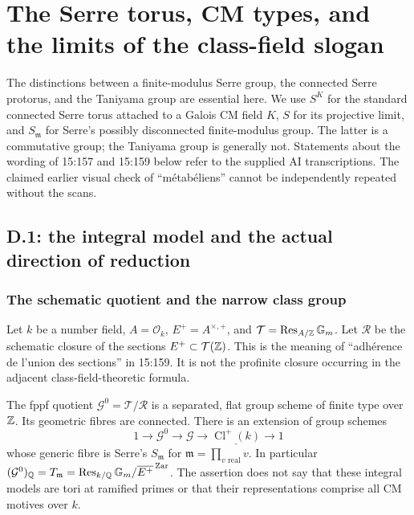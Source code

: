 \section{The Serre torus, CM types, and the limits of the class-field slogan}
\label{sec:part-d}

\providecommand{\Res}{\operatorname{Res}}
\providecommand{\MT}{\operatorname{MT}}
\providecommand{\Cl}{\operatorname{Cl}}
\providecommand{\CM}{\operatorname{CM}}
\providecommand{\Tors}{\operatorname{Tors}}
\providecommand{\Isom}{\operatorname{Isom}}
\providecommand{\cor}{\operatorname{cor}}
\providecommand{\res}{\operatorname{res}}
\providecommand{\ord}{\operatorname{ord}}

The distinctions between a finite-modulus Serre group, the connected Serre
protorus, and the Taniyama group are essential here.  We use $S^K$ for the
standard connected Serre torus attached to a Galois CM field $K$, $S$ for its
projective limit, and $S_{\mathfrak m}$ for Serre's possibly disconnected
finite-modulus group.  The latter is a commutative group; the Taniyama group
is generally not.  Statements about the wording of 15:157 and 15:159 below
refer to the supplied AI transcriptions.  The claimed earlier visual check
of ``m\'etab\'eliens'' cannot be independently repeated without the scans.

\subsection{D.1: the integral model and the actual direction of reduction}
\label{subsec:d1}

\subsubsection{The schematic quotient and the narrow class group}

Let $k$ be a number field, $A=\mathcal O_k$, $E^+=A^{\times,+}$, and
$\mathcal T=\Res_{A/\Z}\Gm$.  Let $\mathcal R$ be the schematic closure
of the sections $E^+\subset\mathcal T(\mathbb Z)$.  This is the meaning of
``adh\'erence de l'union des sections'' in 15:159.  It is not the profinite
closure occurring in the adjacent class-field-theoretic formula.

\begin{proposition}
\label{prop:d-integral-serre}
The fppf quotient $\mathcal G^0=\mathcal T/\mathcal R$ is a separated,
flat group scheme of finite type over $\mathbb Z$.  Its geometric fibres are
connected.  There is an extension of group schemes
\[
  1\longrightarrow\mathcal G^0\longrightarrow\mathcal G
   \longrightarrow\underline{\Cl^+(k)}\longrightarrow1
\]
whose generic fibre is Serre's $S_{\mathfrak m}$ for
$\mathfrak m=\prod_{v\text{ real}}v$.  In particular
$(\mathcal G^0)_\Q=T_{\mathfrak m}
=\Res_{k/\Q}\Gm/\overline{E^+}^{\,\mathrm{Zar}}$.
The assertion does not say that these integral models are tori at ramified
primes or that their representations comprise all CM motives over $k$.
\end{proposition}

